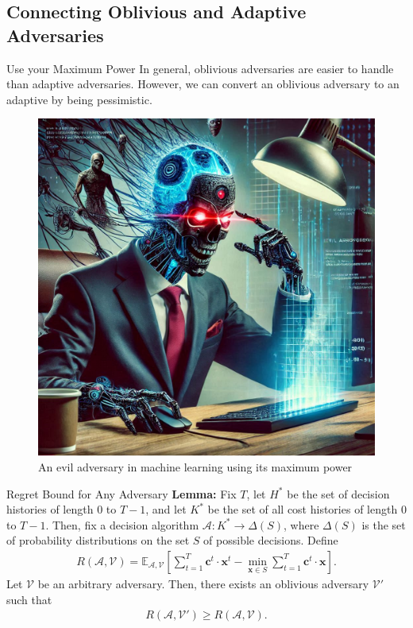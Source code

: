 \documentclass{beamer}
\begin{document}
\subsection{Connecting Oblivious and Adaptive Adversaries}
\begin{frame}{Use your Maximum Power}
    In general, oblivious adversaries are easier to handle than adaptive adversaries. However, we can convert an oblivious adversary to an adaptive by being pessimistic.
    \begin{figure}
        \centering
        \includegraphics[width=0.4\linewidth]{images/An evil adversary in machine learning using its maximum power, with a focus on machine learning and optimization.png}
        \caption{An evil adversary in machine learning using its maximum power}
    \end{figure}
\end{frame}

\begin{frame}{Regret Bound for Any Adversary}
    \textbf{Lemma:}
        Fix $T$, let $H^*$ be the set of decision histories of length $0$ to $T-1$, and let $K^*$ be the set of all cost histories of length $0$ to $T-1$. Then, fix a decision algorithm $\mathcal{A} : K^* \to \Delta(S)$, where $\Delta(S)$ is the set of probability distributions on the set $S$ of possible decisions. Define
        \begin{align*}
            R(\mathcal{A}, \mathcal{V}) = \mathbb{E}_{\mathcal{A}, \mathcal{V}} \left[ \sum_{t=1}^T \mathbf{c}^t \cdot \mathbf{x}^t - \min_{\mathbf{x} \in S} \sum_{t=1}^T \mathbf{c}^t \cdot \mathbf{x} \right].
        \end{align*}
        Let $\mathcal{V}$ be an arbitrary adversary. Then, there exists an oblivious adversary $\mathcal{V}'$ such that
        \begin{align*}            
            R(\mathcal{A}, \mathcal{V}') \geq R(\mathcal{A}, \mathcal{V}).
        \end{align*}
\end{frame}
\end{document}
